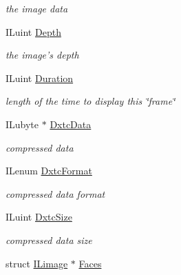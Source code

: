 \begin{DoxyCompactItemize}
\begin{DoxyCompactList}\small\item\em the image data \end{DoxyCompactList}\item 
\hypertarget{struct_i_limage_a2a4c47a9713bee335a0830b336bdc951}{I\-Luint \hyperlink{struct_i_limage_a2a4c47a9713bee335a0830b336bdc951}{Depth}}\label{struct_i_limage_a2a4c47a9713bee335a0830b336bdc951}

\begin{DoxyCompactList}\small\item\em the image's depth \end{DoxyCompactList}\item 
\hypertarget{struct_i_limage_ae10866868b7cebc0e7be76b72de2c528}{I\-Luint \hyperlink{struct_i_limage_ae10866868b7cebc0e7be76b72de2c528}{Duration}}\label{struct_i_limage_ae10866868b7cebc0e7be76b72de2c528}

\begin{DoxyCompactList}\small\item\em length of the time to display this \char`\"{}frame\char`\"{} \end{DoxyCompactList}\item 
\hypertarget{struct_i_limage_a1009725f04fa7e66a567a011f3886cd8}{I\-Lubyte $\ast$ \hyperlink{struct_i_limage_a1009725f04fa7e66a567a011f3886cd8}{Dxtc\-Data}}\label{struct_i_limage_a1009725f04fa7e66a567a011f3886cd8}

\begin{DoxyCompactList}\small\item\em compressed data \end{DoxyCompactList}\item 
\hypertarget{struct_i_limage_a3b755d25246f67df6805c2921e7f5dd9}{I\-Lenum \hyperlink{struct_i_limage_a3b755d25246f67df6805c2921e7f5dd9}{Dxtc\-Format}}\label{struct_i_limage_a3b755d25246f67df6805c2921e7f5dd9}

\begin{DoxyCompactList}\small\item\em compressed data format \end{DoxyCompactList}\item 
\hypertarget{struct_i_limage_a22a07ef5328eedcf9b6ba7cecd498ec3}{I\-Luint \hyperlink{struct_i_limage_a22a07ef5328eedcf9b6ba7cecd498ec3}{Dxtc\-Size}}\label{struct_i_limage_a22a07ef5328eedcf9b6ba7cecd498ec3}

\begin{DoxyCompactList}\small\item\em compressed data size \end{DoxyCompactList}\item 
\hypertarget{struct_i_limage_aa7050b85a7ab3fc70b21ce7bf64fb411}{struct \hyperlink{struct_i_limage}{I\-Limage} $\ast$ \hyperlink{struct_i_limage_aa7050b85a7ab3fc70b21ce7bf64fb411}{Faces}}\label{struct_i_limage_aa7050b85a7ab3fc70b21ce7bf64fb411}


\end{DoxyCompactItemize}
